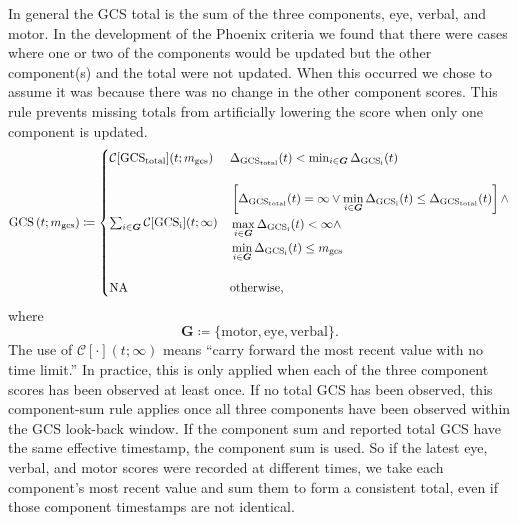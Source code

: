 \documentclass[letterpaper,10pt]{article}
\begin{document}
In general the GCS total is the sum of the three components, eye,
verbal, and motor. In the development of the Phoenix criteria we found
that there were cases where one or two of the components would be
updated but the other component(s) and the total were not updated. When
this occurred we chose to assume it was because there was no change in
the other component scores. This rule prevents missing totals from
artificially lowering the score when only one component is updated.
\begin{equation}
  \label{eq:gcs}
  \mathrm{GCS}\left(t; m_{\mathrm{gcs}}\right) \coloneqq
  \begin{cases}
    \mathcal{C}[\mathrm{GCS}_{\mathrm{total}}](t;m_{\mathrm{gcs}}) & \Delta_{\mathrm{GCS}_{\mathrm{total}}}(t) < \min_{i \in \boldsymbol{G}} \Delta_{\mathrm{GCS}_{\mathrm{i}}}(t) \\ \\
    \sum_{i \in \boldsymbol{G}} \mathcal{C}[\mathrm{GCS}_{\mathrm{i}}](t;\infty) &
    \begin{aligned}
      & \left[
        \Delta_{\mathrm{GCS}_{\mathrm{total}}}(t) = \infty \vee
        \min_{i \in \boldsymbol{G}} \Delta_{\mathrm{GCS}_{\mathrm{i}}}(t)
        \leq \Delta_{\mathrm{GCS}_{\mathrm{total}}}(t)
        \right] \wedge \\
      & \max_{i \in \boldsymbol{G}} \Delta_{\mathrm{GCS}_{\mathrm{i}}}(t) < \infty
        \wedge \\
      & \min_{i \in \boldsymbol{G}} \Delta_{\mathrm{GCS}_{\mathrm{i}}}(t) \leq m_{\mathrm{gcs}}
    \end{aligned} \\ \\
    \mathrm{NA} & \text{otherwise,}
  \end{cases}
\end{equation}
where
\begin{equation}
  \label{eq:gcs-components}
  \boldsymbol{G} \coloneqq \{\mathrm{motor}, \mathrm{eye}, \mathrm{verbal}\}.
\end{equation}
The use of $\mathcal{C}[\cdot](t;\infty)$ means ``carry forward the most recent value
with no time limit.'' In practice, this is only applied when each of the
three component scores has been observed at least once. If no total GCS has
been observed, this component-sum rule applies once all three components have
been observed within the GCS look-back window. If the component sum and reported
total GCS have the same effective timestamp, the component sum is used. So if
the latest eye, verbal, and motor scores were recorded at different times, we
take each component's most recent value and sum them to form a consistent total,
even if those component timestamps are not identical.
\end{document}
